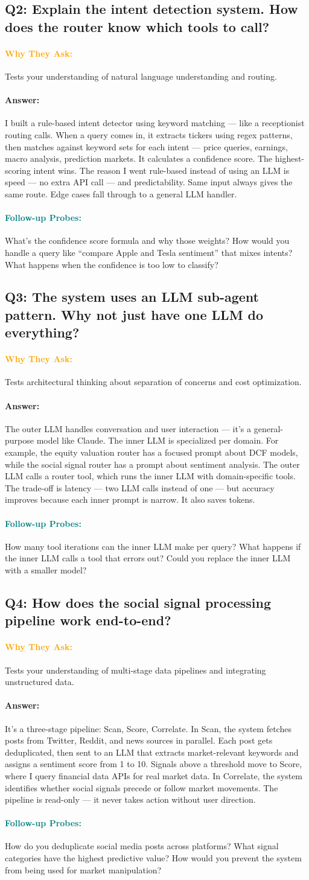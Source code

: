\documentclass[11pt,a4paper]{article}
\newcommand{\Q}[1]{\subsection{#1}}
\newcommand{\Ans}[1]{\paragraph{\textbf{Answer:}} #1}
\newcommand{\Why}{\paragraph{\textcolor{orange}{\textbf{Why They Ask:}}}}
\newcommand{\Probe}{\paragraph{\textcolor{teal}{\textbf{Follow-up Probes:}}}}
\begin{document}
\Q{Q2: Explain the intent detection system. How does the router know which tools to call?}
\Why Tests your understanding of natural language understanding and routing.
\Ans I built a rule-based intent detector using keyword matching --- like a receptionist routing calls. When a query comes in, it extracts tickers using regex patterns, then matches against keyword sets for each intent --- price queries, earnings, macro analysis, prediction markets. It calculates a confidence score. The highest-scoring intent wins. The reason I went rule-based instead of using an LLM is speed --- no extra API call --- and predictability. Same input always gives the same route. Edge cases fall through to a general LLM handler.
\Probe What's the confidence score formula and why those weights? How would you handle a query like ``compare Apple and Tesla sentiment'' that mixes intents? What happens when the confidence is too low to classify?

\Q{Q3: The system uses an LLM sub-agent pattern. Why not just have one LLM do everything?}
\Why Tests architectural thinking about separation of concerns and cost optimization.
\Ans The outer LLM handles conversation and user interaction --- it's a general-purpose model like Claude. The inner LLM is specialized per domain. For example, the equity valuation router has a focused prompt about DCF models, while the social signal router has a prompt about sentiment analysis. The outer LLM calls a router tool, which runs the inner LLM with domain-specific tools. The trade-off is latency --- two LLM calls instead of one --- but accuracy improves because each inner prompt is narrow. It also saves tokens.
\Probe How many tool iterations can the inner LLM make per query? What happens if the inner LLM calls a tool that errors out? Could you replace the inner LLM with a smaller model?

\Q{Q4: How does the social signal processing pipeline work end-to-end?}
\Why Tests your understanding of multi-stage data pipelines and integrating unstructured data.
\Ans It's a three-stage pipeline: Scan, Score, Correlate. In Scan, the system fetches posts from Twitter, Reddit, and news sources in parallel. Each post gets deduplicated, then sent to an LLM that extracts market-relevant keywords and assigns a sentiment score from 1 to 10. Signals above a threshold move to Score, where I query financial data APIs for real market data. In Correlate, the system identifies whether social signals precede or follow market movements. The pipeline is read-only --- it never takes action without user direction.
\Probe How do you deduplicate social media posts across platforms? What signal categories have the highest predictive value? How would you prevent the system from being used for market manipulation?
\end{document}
